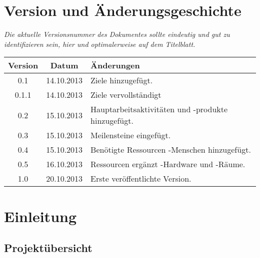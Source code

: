\documentclass[fontsize=12pt,paper=a4,twoside]{scrartcl}
\begin{document}
\newpage

  \thispagestyle{fancy}
  \fancyhead{}
  \fancyfoot{}
  \renewcommand{\headrulewidth}{0.4pt}
  \tableofcontents

\newpage



\section*{Version und Änderungsgeschichte}

{\em Die aktuelle Versionsnummer des Dokumentes sollte eindeutig und gut zu
identifizieren sein, hier und optimalerweise auf dem Titelblatt.}

\begin{tabular}{ccl}
Version & Datum & Änderungen \\
\hline
0.1 & 14.10.2013 & Ziele hinzugefügt.\\
0.1.1 & 14.10.2013 & Ziele vervollständigt\\
0.2 & 15.10.2013 & Hauptarbeitsaktivitäten und -produkte hinzugefügt.\\
0.3 & 15.10.2013 & Meilensteine eingefügt.\\
0.4 & 15.10.2013 & Benötigte Ressourcen -Menschen hinzugefügt.\\
0.5 & 16.10.2013 & Ressourcen ergänzt -Hardware und -Räume.\\
1.0 & 20.10.2013 & Erste veröffentlichte Version. \\
\end{tabular}


\section{Einleitung}

\subsection{Projektübersicht}
\end{document}
